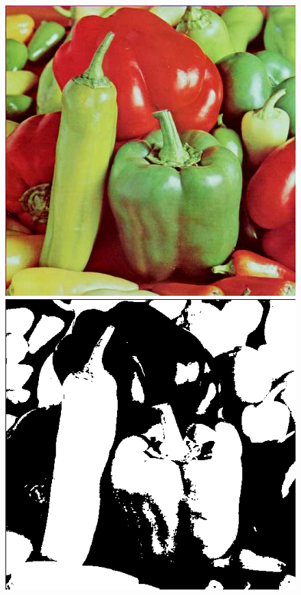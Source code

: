 \documentclass{article}
\begin{document}
\begin{figure}[!htb]
\centering
\includegraphics[scale=0.2]{img/peppers_24bit.png}
\includegraphics[scale=0.2]{img/Progowanie_Globalne_peppers_24bit.png}\\ 

\end{figure}
\end{document}

